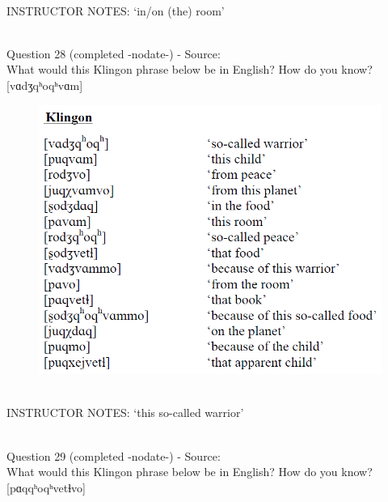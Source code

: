 \documentclass[12pt]{article}
\begin{document}
~\\
INSTRUCTOR NOTES: ‘in/on (the) room’


~\\

{\large Question 28} (completed -nodate-) - Source: \\

What would this Klingon phrase below be in English? How do you know?\\

{[vɑdʒqʰoqʰvɑm]}

\begin{figure}[H]
\includegraphics{../images/klingon.png}
\end{figure}

~\\
INSTRUCTOR NOTES: ‘this so-called warrior’


~\\

{\large Question 29} (completed -nodate-) - Source: \\

What would this Klingon phrase below be in English? How do you know?\\

{[pɑqqʰoqʰvetɬvo]}
\end{document}
